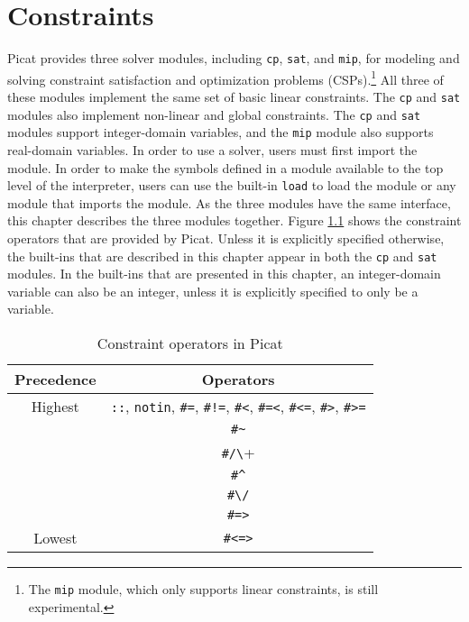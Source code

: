 \chapter{\label{ch:constraints}Constraints}
Picat provides three solver modules, including \texttt{cp}, \texttt{sat}, and \texttt{mip}, for modeling and solving constraint satisfaction and optimization problems (CSPs).\footnote{The \texttt{mip} module, which only supports linear constraints, is still experimental.}  All three of these modules implement the same set of basic linear constraints. The \texttt{cp} and \texttt{sat} modules also implement non-linear and global constraints. The \texttt{cp} and \texttt{sat} modules support integer-domain variables, and the \texttt{mip} module also supports real-domain variables. In order to use a solver, users must first import the module. In order to make the symbols defined in a module available to the top level of the interpreter, users can use the built-in {\tt load} to load the module or any module that imports the module. As the three modules have the same interface, this chapter describes the three modules together. Figure \ref{tab:cons_ops} shows the constraint operators that are provided by Picat. Unless it is explicitly specified otherwise, the built-ins that are described in this chapter appear in both the \texttt{cp} and \texttt{sat} modules. In the built-ins that are presented in this chapter, an integer-domain variable can also be an integer, unless it is explicitly specified to only be a variable.

\begin{table}[ht]
\caption{\label{tab:cons_ops}Constraint operators in Picat}
\begin{center}
\begin{tabular}{ |c|c| } \hline
Precedence & Operators  \\ \hline \hline
Highest    & \verb+::+, \verb+notin+,  \verb+#=+,  \verb+#!=+, \verb+#<+,  \verb+#=<+, \verb+#<=+, \verb+#>+, \verb+#>=+ \\ \hline 
           & \verb+#~+ \\ \hline 
           & \verb+#/\+ \\ \hline 
           & \verb+#^+ \\ \hline 
           & \verb+#\/+ \\ \hline 
           & \verb+#=>+ \\ \hline 
Lowest     & \verb+#<=>+ \\ \hline 
\end{tabular}
\end{center}
\end{table}

